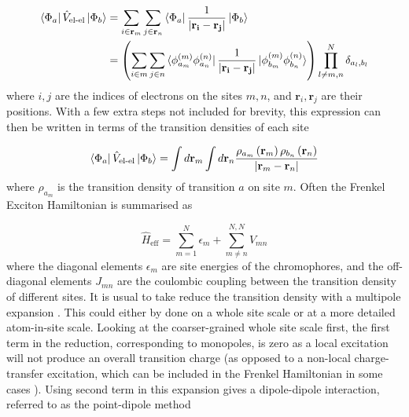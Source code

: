 \begin{equation}
\begin{aligned}
\bra{\Phi_a} \hat{V}_{\text{el-el}}\ket{\Phi_b} &= \sum_{i \in \mathbf{r}_m} \sum_{j \in \mathbf{r}_n} \bra{\Phi_a} \frac{1}{\left|\mathbf{r_i} - \mathbf{r_j}\right|} \ket{\Phi_b} \\
&= \left(\sum_{i \in m} \sum_{j \in n} \bra{\phi^{\left(m\right)}_{a_m} \phi^{\left(n\right)}_{a_n}} \frac{1}{\left|\mathbf{r_i} - \mathbf{r_j}\right|} \ket{\phi^{\left(m\right)}_{b_m}\phi^{\left(n\right)}_{b_n}}\right)\prod^N_{l\neq m,n}\delta_{a_l, b_l}
\end{aligned}
\end{equation}
%
where $i,j$ are the indices of electrons on the sites $m,n$, and $\mathbf{r}_i, 
\mathbf{r}_j$ are their positions. With a few extra steps not included for brevity,
this expression can then be written in terms of the transition densities of each 
site\cite{Scholes2003}

\begin{equation}
\label{eq:coupling_density}
\bra{\Phi_a} \hat{V}_{\text{el-el}}\ket{\Phi_b} = \int d\mathbf{r}_{m} \int d\mathbf{r}_{n} \frac{\rho_{a_m}\left(\mathbf{r}_{m}\right)\rho_{b_n}\left(\mathbf{r}_{n}\right)}{\left|\mathbf{r}_{m} - \mathbf{r}_{n}\right|}
\end{equation}
%
where $\rho_{a_m}$ is the transition density of transition $a$ on site $m$. Often
the Frenkel Exciton Hamiltonian is summarised as

\begin{equation}
\hat{H}_{\text{eff}} = \sum^N_{m=1} \epsilon_m + \sum^{N,N}_{m \neq n} V_{mn}
\end{equation}
%
where the diagonal elements $\epsilon_m$ are site energies of the chromophores, 
and the off-diagonal elements $J_{mn}$ are the coulombic coupling between the transition
density of different sites. It is usual to take reduce the transition density with
a multipole expansion \cite{Steinmann2015}. This could either by done on a whole site
scale or at a more detailed atom-in-site scale. Looking at the coarser-grained whole
site scale first, the first term in the reduction, corresponding to monopoles, is
zero as a local excitation will not produce an overall transition charge (as opposed 
to a non-local charge-transfer excitation, which can be included in the Frenkel 
Hamiltonian in some cases \cite{Li2017}). Using second term in this expansion gives
a dipole-dipole interaction, referred to as the point-dipole method

